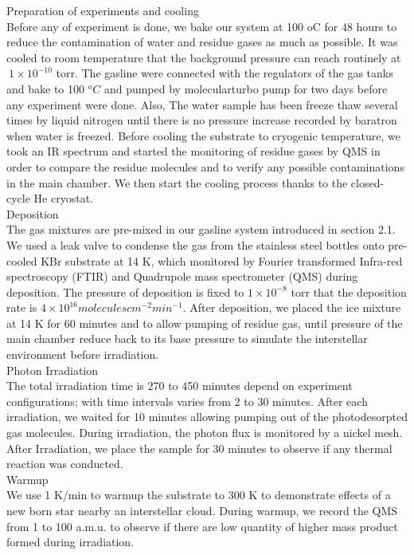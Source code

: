 Preparation of experiments and cooling\\
Before any of experiment is done, we bake our system at 100 oC for 48 hours to reduce the contamination of water and residue gases as much as possible. It was cooled to room temperature that the background pressure can reach routinely at $~ 1 \times 10^{-10}$ torr. The gasline were connected with the regulators of the gas tanks and bake to 100 $^oC$ and pumped by molecularturbo pump for two days before any experiment were done. Also, The water sample has been freeze thaw several times by liquid nitrogen until there is no pressure increase recorded by baratron when water is freezed. Before cooling the substrate to cryogenic temperature, we took an IR spectrum and started the monitoring of residue gases by QMS in order to compare the residue molecules and to verify any possible contaminations in the main chamber. We then start the cooling process thanks to the closed-cycle He cryostat.\\

Deposition\\
The gas mixtures are pre-mixed in our gasline system introduced in section 2.1. We used a leak valve to condense the gas from the stainless steel bottles onto pre-cooled KBr substrate at 14 K, which monitored by Fourier transformed Infra-red spectroscopy (FTIR) and Quadrupole mass spectrometer (QMS) during deposition. The pressure of deposition is fixed to $1 \times 10^{-8}$ torr that the deposition rate is $4 \times 10^{16} molecules cm^{-2} min^{-1}$. After deposition, we placed the ice mixture at 14 K for 60 minutes and to allow pumping of residue gas, until pressure of the main chamber reduce back to its base pressure to simulate the interstellar environment before irradiation.\\

Photon Irradiation\\
The total irradiation time is 270 to 450 minutes depend on experiment configurations; with time intervals varies from 2 to 30 minutes. After each irradiation, we waited for 10 minutes allowing pumping out of the photodesorpted gas molecules. During irradiation, the photon flux is monitored by a nickel mesh. After Irradiation, we place the sample for 30 minutes to observe if any thermal reaction was conducted.\\

Warmup\\
We use 1 K/min to warmup the substrate to 300 K to demonstrate effects of a new born star nearby an interstellar cloud. During warmup, we record the QMS from 1 to 100 a.m.u. to observe if there are low quantity of higher mass product formed during irradiation.\\

